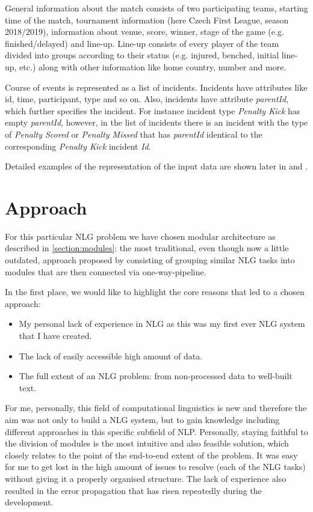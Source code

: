 General information about the match consists of two participating teams, starting time of the match, tournament information (here Czech First League, season 2018/2019), information about venue, score, winner, stage of the game (e.g. finished/delayed) and line-up. Line-up consists of every player of the team divided into groups according to their status (e.g. injured, benched, initial line-up, etc.) along with other information like home country, number and more. 

Course of events is represented as a list of incidents. Incidents have attributes like id, time, participant, type and so on. Also, incidents have attribute \emph{parentId}, which further specifies the incident. For instance incident type \emph{Penalty Kick} has empty \emph{parentId}, however, in the list of incidents there is an incident with the type of \emph{Penalty Scored} or \emph{Penalty Missed} that has \emph{parentId} identical to the corresponding \emph{Penalty Kick} incident \emph{Id}. 

Detailed examples of the representation of the input data are shown later in  and .

\section{Approach}

For this particular NLG problem we have chosen modular architecture as described in \ref{section:modules}: the most traditional, even though now a little outdated, approach proposed by \cite {reiter1997building} consisting of grouping similar NLG tasks into modules that are then connected via one-way-pipeline. 

In the first place, we would like to highlight the core reasons that led to a chosen approach:
\begin{itemize}
	\item My personal lack of experience in NLG as this was my first ever NLG system that I have created.
	\item The lack of easily accessible high amount of data.
	\item The full extent of an NLG problem: from non-processed data to well-built text.   
\end{itemize}

For me, personally, this field of computational linguistics is new and therefore the aim  was not only to build a NLG system, but to gain knowledge including different approaches in this specific subfield of NLP. Personally, staying faithful to the division of modules is the most intuitive and also feasible solution, which closely relates to the point of the end-to-end extent of the problem. It was easy for me to get lost in the high amount of issues to resolve (each of the NLG tasks) without giving it a properly organised structure. The lack of experience also resulted in the error propagation that has risen repeatedly during the development. 


